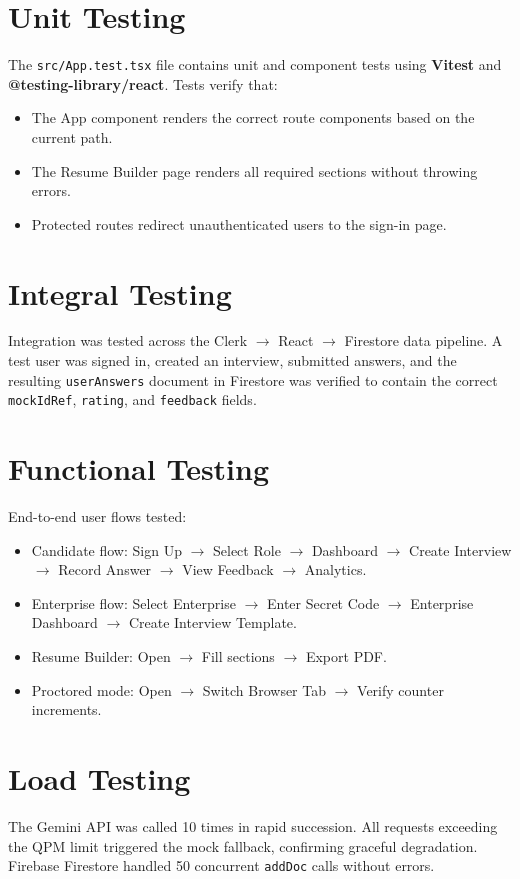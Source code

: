 \documentclass{fisatprojectfinal}
\begin{document}
\section{Unit Testing}
The \texttt{src/App.test.tsx} file contains unit and component tests using \textbf{Vitest}
and \textbf{@testing-library/react}. Tests verify that:
\begin{itemize}
  \item The App component renders the correct route components based on the current path.
  \item The Resume Builder page renders all required sections without throwing errors.
  \item Protected routes redirect unauthenticated users to the sign-in page.
\end{itemize}

\section{Integral Testing}
Integration was tested across the Clerk $\rightarrow$ React $\rightarrow$ Firestore data
pipeline. A test user was signed in, created an interview, submitted answers, and the
resulting \texttt{userAnswers} document in Firestore was verified to contain the correct
\texttt{mockIdRef}, \texttt{rating}, and \texttt{feedback} fields.

\section{Functional Testing}
End-to-end user flows tested:
\begin{itemize}
  \item Candidate flow: Sign Up $\rightarrow$ Select Role $\rightarrow$ Dashboard
        $\rightarrow$ Create Interview $\rightarrow$ Record Answer $\rightarrow$ View
        Feedback $\rightarrow$ Analytics.
  \item Enterprise flow: Select Enterprise $\rightarrow$ Enter Secret Code $\rightarrow$
        Enterprise Dashboard $\rightarrow$ Create Interview Template.
  \item Resume Builder: Open $\rightarrow$ Fill sections $\rightarrow$ Export PDF.
  \item Proctored mode: Open $\rightarrow$ Switch Browser Tab $\rightarrow$ Verify counter
        increments.
\end{itemize}

\section{Load Testing}
The Gemini API was called 10 times in rapid succession. All requests exceeding the QPM limit
triggered the mock fallback, confirming graceful degradation. Firebase Firestore handled 50
concurrent \texttt{addDoc} calls without errors.
\end{document}
